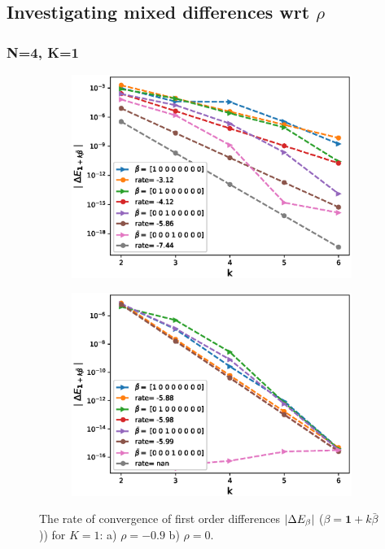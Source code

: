 \documentclass[11pt]{article}
\begin{document}
\subsection{Investigating mixed differences wrt $\rho$ }\label{sec:mixed differences rbergomi_wrt_rho}

\subsubsection*{N=4, K=1 }
\begin{figure}[h!]
\centering
\begin{subfigure}{.5\textwidth}
\centering
\includegraphics[width=1\linewidth]{./figures/effect_rho_differences/H_0_43_K_1/N_4/first_difference_rbergomi_4steps_H_043_K_1_rho__0_9_with_rate_W1.eps}
\caption{}
\label{fig:sub3}
\end{subfigure}%
\begin{subfigure}{.5\textwidth}
\centering
\includegraphics[width=1\linewidth]{./figures/effect_rho_differences/H_0_43_K_1/N_4/first_difference_rbergomi_4steps_H_043_K_1_rho_0_with_rate_W1.eps}
\caption{}
\label{fig:sub4}
\end{subfigure}

\caption{The rate of convergence of  first order differences $\left\lvert\Delta E_{\beta}\right\rvert$ ($\beta=\mathbf{1}+k \bar{\beta}$)) for $K=1$: a) $\rho=-0.9$ b)  $\rho=0.$}
\label{fig:test2}
\end{figure}
\end{document}
